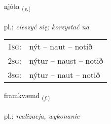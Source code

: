 \documentclass[frontgrid, backgrid]{flacards}\usepackage[]{graphicx}\usepackage[]{xcolor}
\begin{document}
{njóta \small{\textsubscript{(\textit{v.})}} \\[1ex] %
\textphonetic{[njouːta]} \\
pl.: \emph{cieszyć się; korzystać na} \\  [2ex]
\renewcommand*{\arraystretch}{0.8}
\begin{tabular}{p{1cm}l}
\textsc{1sg}: & nýt -- naut -- notið \\ 
\textsc{2sg}: & nýtur -- naust -- notið \\ 
\textsc{3sg}: & nýtur -- naut -- notið \\ 
\end{tabular}
}

\renewcommand{\flhead}{\vskip5pt \fboxsep=0pt {\small\bfseries\footnotesize Nafnorð | rzeczownik}}
\renewcommand{\fcfoot}{\vskip5pt \fboxsep=0pt \hspace{2pt}{\small\bfseries\footnotesize 1K}}

\renewcommand{\blhead}{\vskip5pt {\small\bfseries\footnotesize Nafnorð | rzeczownik }}
\renewcommand{\bcfoot}{\vskip5pt \hspace{2pt}{\small\bfseries\footnotesize 1K}}


{framkvæmd \small{\textsubscript{(\textit{f.})}} \\[1ex] %
\textphonetic{[framkʰvaimt]} \\
pl.: \emph{realizacja, wykonanie} \\  [2ex]
\renewcommand*{\arraystretch}{0.8}
}

\renewcommand{\flhead}{\vskip5pt \fboxsep=0pt {\small\bfseries\footnotesize Lýsingarorð | przymiotnik}}
\renewcommand{\fcfoot}{\vskip5pt \fboxsep=0pt \hspace{2pt}{\small\bfseries\footnotesize 1K}}
\end{document}
